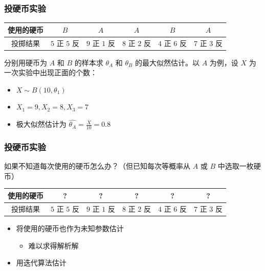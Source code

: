 \documentclass{beamer}
\newcommand{\Gh}{\theta}
\begin{document}
\begin{frame}
    \frametitle{投硬币实验}

    \begin{table}
        \begin{tabular}{c|c|c|c|c|c}
            使用的硬币 & $B$ & $A$ & $A$ & $B$ & $A$ \\\hline
            投掷结果 & $5$ 正 $5$ 反 & $9$ 正 $1$ 反 & $8$ 正 $2$ 反 & $4$ 正 $6$ 反 & $7$ 正 $3$ 反
        \end{tabular}
    \end{table}

    \bigskip

    分别用硬币为 $A$ 和 $B$ 的样本求 $\Gh_A$ 和 $\Gh_B$ 的最大似然估计。以 $A$ 为例，设 $X$ 为一次实验中出现正面的个数：

    \begin{itemize}
        \item $X \sim B(10, \Gh_1)$
        \item $X_1 = 9, X_2 = 8, X_3 = 7$
        \item 极大似然估计为 $\hat{\Gh_A} = \frac{\overline{X}}{10} = 0.8$
    \end{itemize}

\end{frame}

\begin{frame}
    \frametitle{投硬币实验}

    如果不知道每次使用的硬币怎么办？（但已知每次等概率从 $A$ 或 $B$ 中选取一枚硬币）

    \begin{table}
        \begin{tabular}{c|c|c|c|c|c}
            使用的硬币 & ? & ? & ? & ? & ? \\\hline
            投掷结果 & $5$ 正 $5$ 反 & $9$ 正 $1$ 反 & $8$ 正 $2$ 反 & $4$ 正 $6$ 反 & $7$ 正 $3$ 反
        \end{tabular}
    \end{table}

    \begin{itemize}
        \item 将使用的硬币也作为未知参数估计
        \begin{itemize}
            \item 难以求得解析解
        \end{itemize}
        \item 用迭代算法估计
    \end{itemize}

\end{frame}
\end{document}
